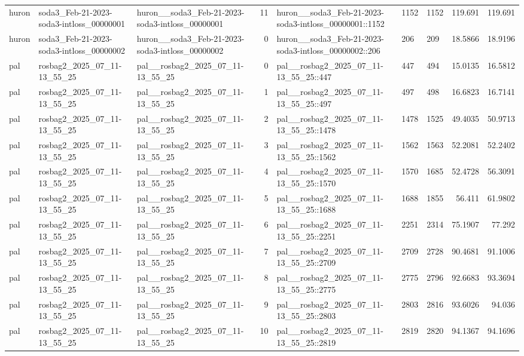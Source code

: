 \begin{longtable}{lllrlllrr}
huron & soda3\_Feb-21-2023-soda3-intloss\_00000001 & huron\_\_soda3\_Feb-21-2023-soda3-intloss\_00000001 & 11 & huron\_\_soda3\_Feb-21-2023-soda3-intloss\_00000001::1152 & 1152 & 1152 & 119.691 & 119.691 \\
huron & soda3\_Feb-21-2023-soda3-intloss\_00000002 & huron\_\_soda3\_Feb-21-2023-soda3-intloss\_00000002 & 0 & huron\_\_soda3\_Feb-21-2023-soda3-intloss\_00000002::206 & 206 & 209 & 18.5866 & 18.9196 \\
pal & rosbag2\_2025\_07\_11-13\_55\_25 & pal\_\_rosbag2\_2025\_07\_11-13\_55\_25 & 0 & pal\_\_rosbag2\_2025\_07\_11-13\_55\_25::447 & 447 & 494 & 15.0135 & 16.5812 \\
pal & rosbag2\_2025\_07\_11-13\_55\_25 & pal\_\_rosbag2\_2025\_07\_11-13\_55\_25 & 1 & pal\_\_rosbag2\_2025\_07\_11-13\_55\_25::497 & 497 & 498 & 16.6823 & 16.7141 \\
pal & rosbag2\_2025\_07\_11-13\_55\_25 & pal\_\_rosbag2\_2025\_07\_11-13\_55\_25 & 2 & pal\_\_rosbag2\_2025\_07\_11-13\_55\_25::1478 & 1478 & 1525 & 49.4035 & 50.9713 \\
pal & rosbag2\_2025\_07\_11-13\_55\_25 & pal\_\_rosbag2\_2025\_07\_11-13\_55\_25 & 3 & pal\_\_rosbag2\_2025\_07\_11-13\_55\_25::1562 & 1562 & 1563 & 52.2081 & 52.2402 \\
pal & rosbag2\_2025\_07\_11-13\_55\_25 & pal\_\_rosbag2\_2025\_07\_11-13\_55\_25 & 4 & pal\_\_rosbag2\_2025\_07\_11-13\_55\_25::1570 & 1570 & 1685 & 52.4728 & 56.3091 \\
pal & rosbag2\_2025\_07\_11-13\_55\_25 & pal\_\_rosbag2\_2025\_07\_11-13\_55\_25 & 5 & pal\_\_rosbag2\_2025\_07\_11-13\_55\_25::1688 & 1688 & 1855 & 56.411 & 61.9802 \\
pal & rosbag2\_2025\_07\_11-13\_55\_25 & pal\_\_rosbag2\_2025\_07\_11-13\_55\_25 & 6 & pal\_\_rosbag2\_2025\_07\_11-13\_55\_25::2251 & 2251 & 2314 & 75.1907 & 77.292 \\
pal & rosbag2\_2025\_07\_11-13\_55\_25 & pal\_\_rosbag2\_2025\_07\_11-13\_55\_25 & 7 & pal\_\_rosbag2\_2025\_07\_11-13\_55\_25::2709 & 2709 & 2728 & 90.4681 & 91.1006 \\
pal & rosbag2\_2025\_07\_11-13\_55\_25 & pal\_\_rosbag2\_2025\_07\_11-13\_55\_25 & 8 & pal\_\_rosbag2\_2025\_07\_11-13\_55\_25::2775 & 2775 & 2796 & 92.6683 & 93.3694 \\
pal & rosbag2\_2025\_07\_11-13\_55\_25 & pal\_\_rosbag2\_2025\_07\_11-13\_55\_25 & 9 & pal\_\_rosbag2\_2025\_07\_11-13\_55\_25::2803 & 2803 & 2816 & 93.6026 & 94.036 \\
pal & rosbag2\_2025\_07\_11-13\_55\_25 & pal\_\_rosbag2\_2025\_07\_11-13\_55\_25 & 10 & pal\_\_rosbag2\_2025\_07\_11-13\_55\_25::2819 & 2819 & 2820 & 94.1367 & 94.1696 \\

\end{longtable}
